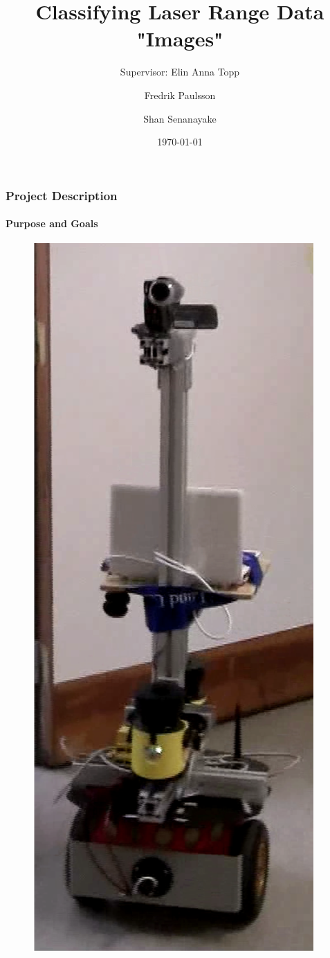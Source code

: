 \documentclass{beamer}
\title[Classifying Laser Range Data "Images"] %
{Classifying Laser Range Data "Images"}
\subtitle{Supervisor: Elin Anna Topp}
\author[F. Paulsson, S. Senanayake]%
{Fredrik Paulsson \and Shan Senanayake}
\institute[LTH] %
{Lund University \\ Faculty of Engineering}
\date[\today] %
{\today}
\begin{document}
\frame{\titlepage}

\begin{frame}[shrink]
\frametitle{Project Description}
\framesubtitle{Purpose and Goals}

\begin{figure}
\vspace{-35pt}
  \begin{center}
    \includegraphics[height=0.87\textheight]{presimg/robot.png}
  \end{center}
\end{figure}


\end{frame}
\end{document}
